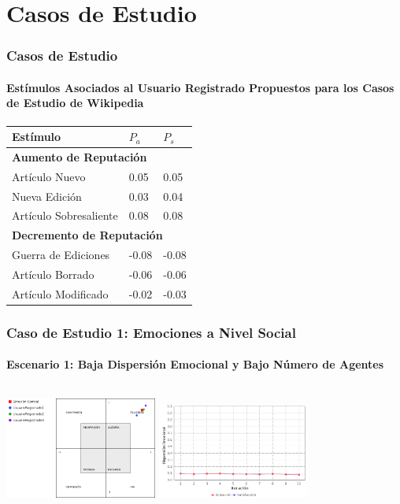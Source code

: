 \documentclass{beamer}
\begin{document}
\section{Casos de Estudio}

\begin{frame}
\frametitle{Casos de Estudio}
\framesubtitle{Estímulos Asociados al Usuario Registrado Propuestos para los Casos de Estudio de Wikipedia}
\begin{table}[!ht]
\centering
\scriptsize
\begin{tabular}{lll}
\hline
Estímulo & $P_a$ & $P_s$ \\
\hline\hline
\multicolumn{3}{l}{\textbf{Aumento de Reputación}} \\ \hline\hline
Artículo Nuevo & 0.05 & 0.05  \\ \hline
Nueva Edición & 0.03 & 0.04  \\ \hline
Artículo Sobresaliente & 0.08 & 0.08  \\ \hline\hline
\multicolumn{3}{l}{\textbf{Decremento de Reputación}} \\ \hline\hline
Guerra de Ediciones & -0.08 & -0.08 \\ \hline
Artículo Borrado & -0.06 & -0.06  \\ \hline
Artículo Modificado & -0.02 & -0.03  \\
\hline
\end{tabular}
\end{table}
\end{frame}

\begin{frame}
\frametitle{Caso de Estudio 1: Emociones a Nivel Social}
\framesubtitle{Escenario 1: Baja Dispersión Emocional y Bajo Número de Agentes}
\begin{columns}
\tiny
\centering
\includegraphics[width=5cm]{ilustraciones/caso1escenario1-emocioncentral}
\tiny
\centering
\includegraphics[width=5cm]{ilustraciones/caso1escenario1-dispersionemocional}
\end{columns}
\end{frame}
\end{document}
